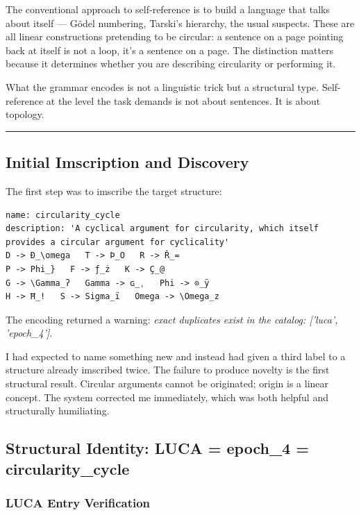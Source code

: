 \documentclass[12pt,a4paper]{article}
\begin{document}
The conventional approach to self-reference is to build a language that talks about itself --- Gödel numbering, Tarski's hierarchy, the usual suspects. These are all linear constructions pretending to be circular: a sentence on a page pointing back at itself is not a loop, it's a sentence on a page. The distinction matters because it determines whether you are describing circularity or performing it.

What the grammar encodes is not a linguistic trick but a structural type. Self-reference at the level the task demands is not about sentences. It is about topology.

\begin{center}
\rule{0.5\textwidth}{0.4pt}
\end{center}

\subsection{Initial Imscription and Discovery}

The first step was to imscribe the target structure:

\begin{lstlisting}
name: circularity_cycle
description: 'A cyclical argument for circularity, which itself provides a circular argument for cyclicality'
D -> Ð_\omega   T -> Þ_O   R -> Ř_=
P -> Phi_}   F -> ƒ_ż   K -> Ç_@
G -> \Gamma_ʔ   Gamma -> ɢ_ˌ   Phi -> ⊙_ÿ
H -> Ħ_!   S -> Sigma_ï   Omega -> \Omega_z
\end{lstlisting}

The encoding returned a warning: \emph{exact duplicates exist in the catalog: {[}'luca', 'epoch\_4'{]}}.

I had expected to name something new and instead had given a third label to a structure already imscribed twice. The failure to produce novelty is the first structural result. Circular arguments cannot be originated; origin is a linear concept. The system corrected me immediately, which was both helpful and structurally humiliating.

\subsection{Structural Identity: LUCA = epoch\_4 = circularity\_cycle}

\subsubsection{LUCA Entry Verification}
\end{document}
